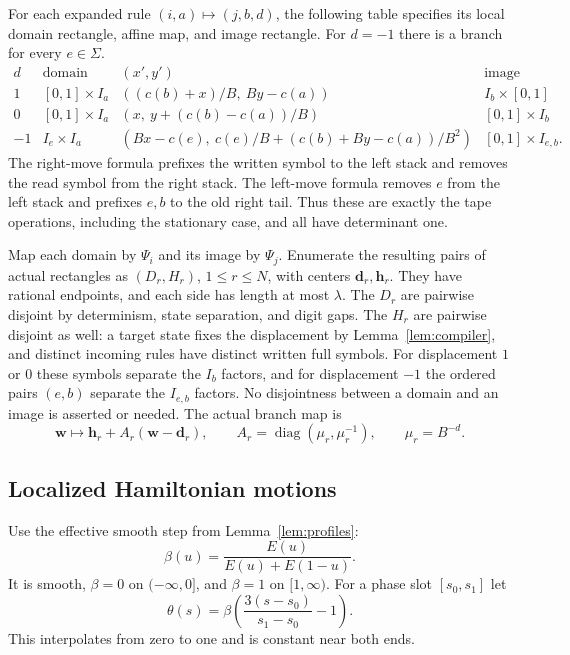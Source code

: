 \documentclass[11pt]{article}
\theoremstyle{remark}\newtheorem{remark}[theorem]{Remark}
\begin{document}
For each expanded rule $(i,a)\mapsto(j,b,d)$, the following table
specifies its local domain rectangle, affine map, and image rectangle.
For $d=-1$ there is a branch for every $e\in\Sigma$.
\begin{equation}\label{eq:branch-table}
\begin{array}{c|c|c|c}
d&\text{domain}&(x',y')&\text{image}\\ \hline
1 &[0,1]\times I_a
 &((c(b)+x)/B,\ By-c(a))&I_b\times[0,1]\\[2pt]
0 &[0,1]\times I_a
 &(x,\ y+(c(b)-c(a))/B)&[0,1]\times I_b\\[2pt]
-1&I_e\times I_a
 &(Bx-c(e),\ c(e)/B+(c(b)+By-c(a))/B^2)
 &[0,1]\times I_{e,b}.
\end{array}
\end{equation}
The right-move formula prefixes the written symbol to the left stack
and removes the read symbol from the right stack.  The left-move formula
removes $e$ from the left stack and prefixes $e,b$ to the old right
tail.  Thus these are exactly the tape operations, including the
stationary case, and all have determinant one.

Map each domain by $\Psi_i$ and its image by $\Psi_j$.  Enumerate the
resulting pairs of actual rectangles as $(D_r,H_r)$, $1\le r\le N$,
with centers $\mathbf d_r,\mathbf h_r$.  They have rational endpoints,
and each side has length at most $\lambda$.  The $D_r$ are pairwise
disjoint by determinism, state separation, and digit gaps.  The $H_r$
are pairwise disjoint as well: a target state fixes the displacement
by Lemma~\ref{lem:compiler}, and distinct incoming rules have distinct
written full symbols.  For displacement $1$ or $0$ these symbols
separate the $I_b$ factors, and for displacement $-1$ the ordered
pairs $(e,b)$ separate the $I_{e,b}$ factors.  No disjointness between
a domain and an image is asserted or needed.  The actual branch map is
\begin{equation}\label{eq:actual-branch}
 \mathbf w\longmapsto
 \mathbf h_r+A_r(\mathbf w-\mathbf d_r),\qquad
 A_r=\operatorname{diag}(\mu_r,\mu_r^{-1}),\qquad
 \mu_r=B^{-d}.
\end{equation}

\subsection{Localized Hamiltonian motions}

Use the effective smooth step from Lemma~\ref{lem:profiles}:
\begin{equation}\label{eq:smooth-step}
 \beta(u)=\frac{E(u)}{E(u)+E(1-u)}.
\end{equation}
It is smooth, $\beta=0$ on $(-\infty,0]$, and $\beta=1$ on
$[1,\infty)$.
For a phase slot $[s_0,s_1]$ let
\[
 \theta(s)=\beta\left(\frac{3(s-s_0)}{s_1-s_0}-1\right).
\]
This interpolates from zero to one and is constant near both ends.
\end{document}
